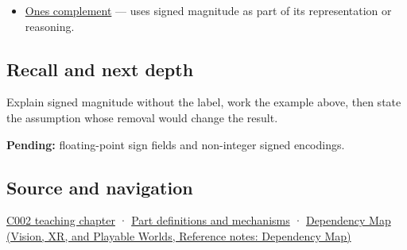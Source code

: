 \hypertarget{appendix-ce20506c8532-used-by}{}

\begin{itemize}
\tightlist
\item
  \hyperref[appendix-03c678cd40b3]{One\textquotesingle s complement} --- uses signed magnitude as part of its representation or reasoning.
\end{itemize}

\subsection{Recall and next depth}\label{appendix-ce20506c8532-recall-and-next-depth}

\hypertarget{appendix-ce20506c8532-recall-and-next-depth}{}

Explain signed magnitude without the label, work the example above, then state the assumption whose removal would change the result.

\textbf{Pending:} floating-point sign fields and non-integer signed encodings.

\subsection{Source and navigation}\label{appendix-ce20506c8532-source-and-navigation}

\hypertarget{appendix-ce20506c8532-source-and-navigation}{}

\hyperref[01-foundations-i-ch001-arithmetic-becomes-a-policy]{C002 teaching chapter} · \hyperref[appendix-fd090d982a15]{Part definitions and mechanisms} · \href{../07-Vision-XR-and-Playable-Worlds/main.pdf\#nameddest=appendix-4ad47bdd269a}{Dependency Map (Vision, XR, and Playable Worlds, Reference notes: Dependency Map)}
